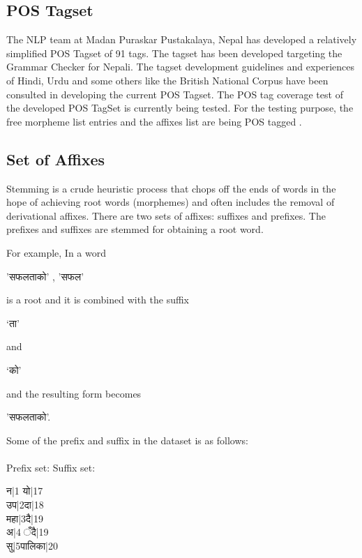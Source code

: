\documentclass[conference]{IEEEtran}
\begin{document}
\subsection {POS Tagset}

The NLP team at Madan Puraskar Pustakalaya,
Nepal has developed a relatively simplified POS
Tagset of 91 tags. The tagset has been developed
targeting the Grammar Checker for Nepali. The tagset
development guidelines and experiences of Hindi,
Urdu and some others like the British National Corpus
have been consulted in developing the current POS
Tagset. The POS tag coverage test of the developed
POS TagSet is currently being tested. For the testing
purpose, the free morpheme list entries and the
affixes list are being POS tagged \cite{r10}.

\subsection {Set of Affixes}

Stemming is a crude heuristic process that chops off the ends of words in the hope of 
achieving root words (morphemes) and often includes the removal of
derivational affixes. There are two sets of affixes: suffixes and prefixes. The prefixes and suffixes
are stemmed for obtaining a root word.

For example, 
In a word \begin{sanskrit} 'सफलताको' 
, 'सफल' \end{sanskrit} is a root and it is combined with the suffix
\begin{sanskrit}‘ता’\end{sanskrit}  and \begin{sanskrit}‘को’\end{sanskrit} and the
resulting form becomes \begin{sanskrit} 'सफलताको'. \end{sanskrit}Some of the prefix
and suffix in the dataset is as follows:\\\\
Prefix set: \qquad Suffix set:\\
\begin{sanskrit}
न|1\hspace{52pt} यो|17\\
उप|2\hspace{50pt}दा|18\\
महा|3\hspace{48pt}दै|19\\
अ|4\hspace{50pt} ँदै|19\\
सु|5\hspace{54pt}पालिका|20\\
\end{sanskrit}
\end{document}
